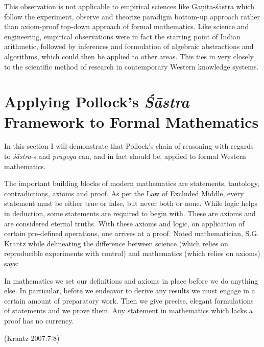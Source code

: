 This observation is not applicable to empirical sciences like Gaṇita-śāstra which follow the experiment, observe and theorize paradigm bottom-up approach rather than axiom-proof top-down approach of formal mathematics. Like science and engineering, empirical observations were in fact the starting point of Indian arithmetic, followed by inferences and formulation of algebraic abstractions and algorithms, which could then be applied to other areas. This ties in very closely to the scientific method of research in contemporary Western knowledge systems.

\section*{Applying Pollock’s {\sl\bfseries Śāstra} Framework to Formal Mathematics}

In this section I will demonstrate that Pollock’s chain of reasoning with regards to {\sl śāstra}-s and {\sl prayoga} can, and in fact should be, applied to formal Western mathematics.

The important building blocks of modern mathematics are statements, tautology, contradictions, axioms and proof. As per the Law of Excluded Middle, every statement must be either true or false, but never both or none.  While logic helps in deduction, some statements are required to begin with. These are axioms and are considered eternal truths. With these axioms and logic, on application of certain pre-defined operations, one arrives at a proof. Noted mathematician, S.G. Krantz while delineating the difference between science (which relies on reproducible experiments with control) and mathematics (which relies on axioms) says: 
\begin{myquote}
In mathematics we set our definitions and axioms in place before we do anything else. In particular, before we endeavor to derive any results we must engage in a certain amount of preparatory work. Then we give precise, elegant formulations of statements and we prove them. Any statement in mathematics which lacks a proof has no currency. 	

\hfill (Krantz 2007:7-8)
\end{myquote}

